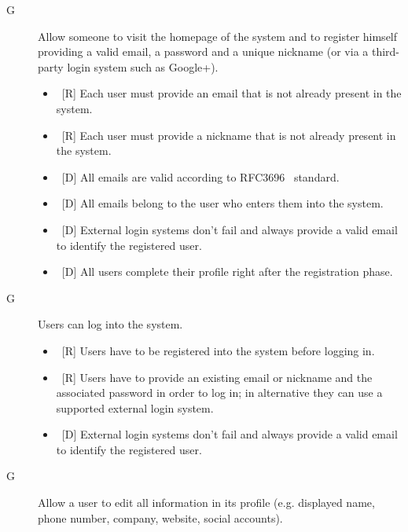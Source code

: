 \setcounter{countReq}{1}

\begin{description}
\item[G\thecountReq] Allow someone to visit the homepage of the system and to register himself providing a valid email, a password and a unique nickname (or via a third-party login system such as Google+).

\begin{itemize}
\item~[R] Each user must provide an email that is not already present in the system.
\item~[R] Each user must provide a nickname that is not already present in the system.
\end{itemize}

\begin{itemize}
\item~[D] All emails are valid according to RFC3696~\cite{RFC3696} standard.
\item~[D] All emails belong to the user who enters them into the system.
\item~[D] External login systems don’t fail and always provide a valid email to identify the registered user.
\item~[D] All users complete their profile right after the registration phase.
\end{itemize}

\item[G\thecountReq] Users can log into the system.

\begin{itemize}
\item~[R] Users have to be registered into the system before logging in.
\item~[R] Users have to provide an existing email or nickname and the associated password in order to log in; in alternative they can use a supported external login system.
\end{itemize}

\begin{itemize}
\item~[D] External login systems don’t fail and always provide a valid email to identify the registered user.
\end{itemize}

\item[G\thecountReq] Allow a user to edit all information in its profile (e.g. displayed name, phone number, company, website, social accounts).


\end{description}
